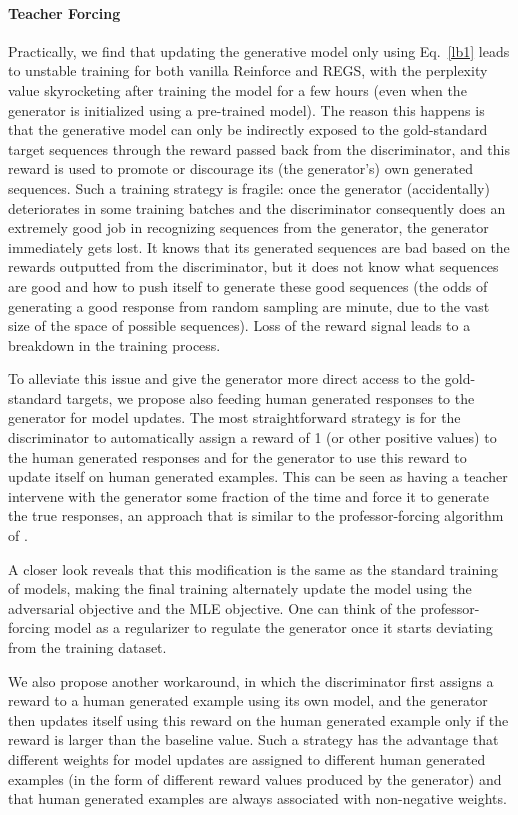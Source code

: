 \paragraph{Teacher Forcing}
Practically, we find that  updating the generative model only using Eq.~\ref{lb1} leads to  unstable training for both vanilla Reinforce and REGS, with the perplexity value skyrocketing after training the model for a few hours (even when the generator is initialized using a pre-trained \sts model). The reason this happens is that the generative model can only be indirectly exposed to the gold-standard target sequences through the reward 
passed back from the
 discriminator, and this reward is used to promote or discourage its (the generator's) own generated sequences. Such a training strategy is fragile: once the generator (accidentally) deteriorates in some training batches and the discriminator consequently does an extremely good job in recognizing sequences from the generator,  
the generator immediately gets lost. It knows that its generated sequences are bad based on the rewards outputted from the discriminator, but it does not know what sequences are good and how to push itself to generate these good sequences (the odds of generating a good response from random sampling are minute, due to the vast size of the space of possible sequences). Loss of the reward signal leads to a breakdown in the training process.

To alleviate this issue and give the generator more direct access to the gold-standard targets, 
we propose also feeding human generated responses to the generator for model updates.  
The most straightforward strategy is for the discriminator to automatically assign a reward of 1 (or other positive values) to the human generated responses and for
the generator to use this reward to update itself on human generated examples. 
This can be seen as having a teacher intervene with the generator some fraction of the time and force it to generate the true responses, 
an approach that is similar to the professor-forcing algorithm of .

A closer look reveals that 
this modification is the same as the standard training of \sts models, making the final training
alternately update the \sts model using the adversarial objective and the MLE objective. One can think of the 
professor-forcing 
model as a regularizer to 
regulate the generator once it starts deviating from the training dataset.

We also propose another workaround, in which the discriminator first assigns a reward to a human generated example using its own model,  and the generator then updates itself using this reward on the human generated example only if the reward is larger than the baseline value. Such a strategy has the advantage that different weights for model updates are assigned to different human generated examples (in the form of different reward values produced by the generator) and that human generated examples are always associated with non-negative weights. 

